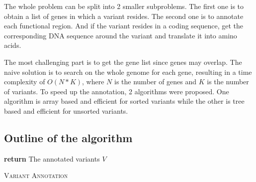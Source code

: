 \documentclass[onehalf,11pt]{beavtex}
\begin{document}
The whole problem can be split into 2 smaller subproblems. The first one is to obtain a list of genes in which a variant resides. The second one is to annotate each functional region. And if the variant resides in a coding sequence, get the corresponding DNA sequence around the variant and translate it into amino acids.

The most challenging part is to get the gene list since genes may overlap. The naive solution is to search on the whole genome for each gene, resulting in a time complexity of $O(N*K)$, where $N$ is the number of genes and $K$ is the number of variants. To speed up the annotation, 2 algorithms were proposed. One algorithm is array based and efficient for sorted variants while the other is tree based and efficient for unsorted variants.

\subsection{Outline of the algorithm}
\IncMargin{1em}
\begin{algorithm}[h!]
 \label{alg:alg_outline}
 \SetAlgoLined

     \BlankLine
     \BlankLine
     \textbf{return} The annotated variants $V$
 \caption{\textsc{Variant Annotation}}
\end{algorithm}\DecMargin{1em} 
\end{document}
